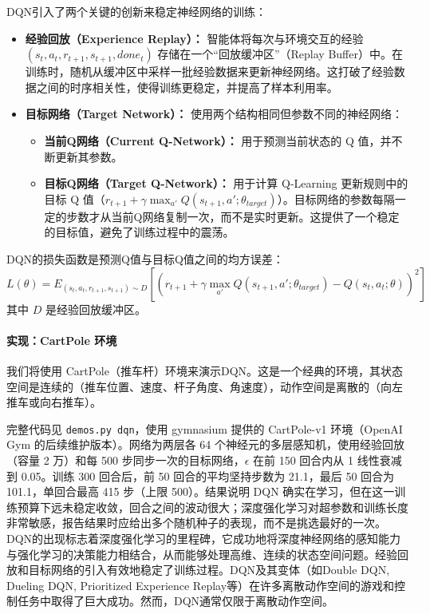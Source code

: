 DQN引入了两个关键的创新来稳定神经网络的训练：
\begin{itemize}
    \item \textbf{经验回放（Experience Replay）：} 智能体将每次与环境交互的经验 $(s_t, a_t, r_{t+1}, s_{t+1}, done_t)$ 存储在一个“回放缓冲区”（Replay Buffer）中。在训练时，随机从缓冲区中采样一批经验数据来更新神经网络。这打破了经验数据之间的时序相关性，使得训练更稳定，并提高了样本利用率。
    \item \textbf{目标网络（Target Network）：} 使用两个结构相同但参数不同的神经网络：
    \begin{itemize}
        \item \textbf{当前Q网络（Current Q-Network）：} 用于预测当前状态的 Q 值，并不断更新其参数。
        \item \textbf{目标Q网络（Target Q-Network）：} 用于计算 Q-Learning 更新规则中的目标 Q 值（$r_{t+1} + \gamma \max_{a'} Q(s_{t+1}, a'; \theta_{target})$）。目标网络的参数每隔一定的步数才从当前Q网络复制一次，而不是实时更新。这提供了一个稳定的目标值，避免了训练过程中的震荡。
    \end{itemize}
\end{itemize}
DQN的损失函数是预测Q值与目标Q值之间的均方误差：
$$ L(\theta) = E_{(s_t, a_t, r_{t+1}, s_{t+1}) \sim D} \left[ \left( r_{t+1} + \gamma \max_{a'} Q(s_{t+1}, a'; \theta_{target}) - Q(s_t, a_t; \theta) \right)^2 \right] $$
其中 $D$ 是经验回放缓冲区。

\paragraph{实现：CartPole 环境}
我们将使用 CartPole（推车杆）环境来演示DQN。这是一个经典的环境，其状态空间是连续的（推车位置、速度、杆子角度、角速度），动作空间是离散的（向左推车或向右推车）。

完整代码见 \texttt{demos.py dqn}，使用 gymnasium 提供的 CartPole-v1 环境（OpenAI Gym 的后续维护版本）。网络为两层各 64 个神经元的多层感知机，使用经验回放（容量 2 万）和每 500 步同步一次的目标网络，$\epsilon$ 在前 150 回合内从 1 线性衰减到 0.05。训练 300 回合后，前 50 回合的平均坚持步数为 21.1，最后 50 回合为 101.1，单回合最高 415 步（上限 500）。结果说明 DQN 确实在学习，但在这一训练预算下远未稳定收敛，回合之间的波动很大；深度强化学习对超参数和训练长度非常敏感，报告结果时应给出多个随机种子的表现，而不是挑选最好的一次。
DQN的出现标志着深度强化学习的里程碑，它成功地将深度神经网络的感知能力与强化学习的决策能力相结合，从而能够处理高维、连续的状态空间问题。经验回放和目标网络的引入有效地稳定了训练过程。DQN及其变体（如Double DQN, Dueling DQN, Prioritized Experience Replay等）在许多离散动作空间的游戏和控制任务中取得了巨大成功。然而，DQN通常仅限于离散动作空间。

